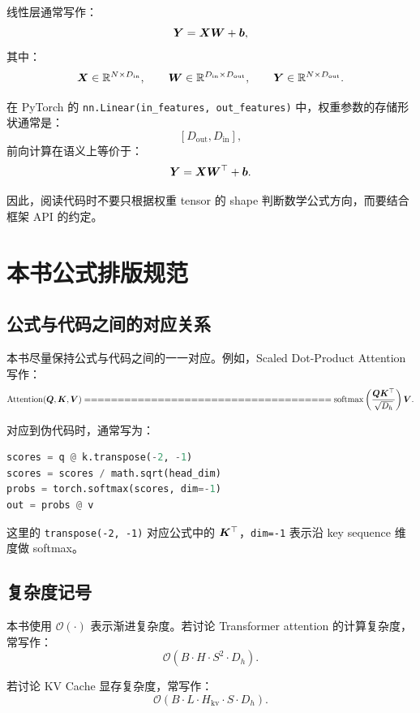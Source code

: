 线性层通常写作：
\[
\bm{Y} = \bm{X}\bm{W} + \bm{b},
\]
其中：
\[
\bm{X} \in \mathbb{R}^{N \times D_{\mathrm{in}}},
\qquad
\bm{W} \in \mathbb{R}^{D_{\mathrm{in}} \times D_{\mathrm{out}}},
\qquad
\bm{Y} \in \mathbb{R}^{N \times D_{\mathrm{out}}}.
\]

在 PyTorch 的 \texttt{nn.Linear(in_features, out_features)} 中，权重参数的存储形状通常是：
\[
[D_{\mathrm{out}}, D_{\mathrm{in}}],
\]
前向计算在语义上等价于：
\[
\bm{Y} = \bm{X}\bm{W}^{\top} + \bm{b}.
\]

因此，阅读代码时不要只根据权重 tensor 的 shape 判断数学公式方向，而要结合框架 API 的约定。

\section{本书公式排版规范}

\subsection{公式与代码之间的对应关系}

本书尽量保持公式与代码之间的一一对应。例如，Scaled Dot-Product Attention 写作：
\[
\Attention(\mat{Q}, \mat{K}, \mat{V})
=====================================

\softmax\left(
\frac{\mat{Q}\mat{K}^{\top}}{\sqrt{D_h}}
\right)\mat{V}.
\]

对应到伪代码时，通常写为：

\begin{lstlisting}[language=Python,caption={Scaled Dot-Product Attention 的基本形式},label={lst:appendix-attention-basic}]
scores = q @ k.transpose(-2, -1)
scores = scores / math.sqrt(head_dim)
probs = torch.softmax(scores, dim=-1)
out = probs @ v
\end{lstlisting}

这里的 \texttt{transpose(-2, -1)} 对应公式中的 $\bm{K}^{\top}$，\texttt{dim=-1} 表示沿 key sequence 维度做 softmax。

\subsection{复杂度记号}

本书使用 $\mathcal{O}(\cdot)$ 表示渐进复杂度。若讨论 Transformer attention 的计算复杂度，常写作：
\[
\mathcal{O}(B \cdot H \cdot S^2 \cdot D_h).
\]

若讨论 KV Cache 显存复杂度，常写作：
\[
\mathcal{O}(B \cdot L \cdot H_{\mathrm{kv}} \cdot S \cdot D_h).
\]

